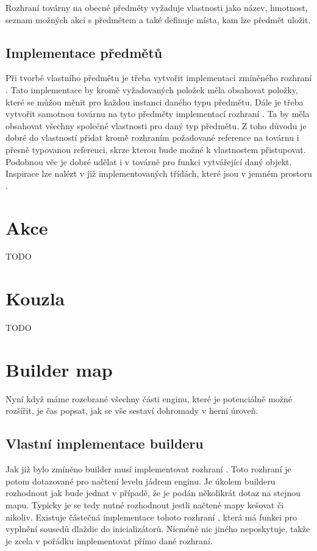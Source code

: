  Rozhraní továrny na obecné předměty vyžaduje vlastnosti jako název, hmotnost, seznam 
možných akcí s předmětem a také definuje místa, kam lze předmět uložit.

\subsection{Implementace předmětů}
Při tvorbě vlastního předmětu je třeba vytvořit implementaci zmíněného rozhraní . Tato implementace by 
kromě vyžadovaných položek měla obsahovat položky, které se můžou měnit pro každou instanci daného typu předmětu. 
Dále je třeba vytvořit samotnou továrnu na tyto předměty implementací rozhraní .
Ta by měla obsahovat všechny společné vlastnosti pro daný typ předmětu. Z toho  důvodu je dobré do vlastností 
přidat kromě rozhraním požadované reference na továrnu i přesně typovanou referenci, skrze kterou bude možné k 
vlastnostem přistupovat. Podobnou věc je dobré udělat i v továrně pro funkci vytvářející daný objekt. Inspirace
lze nalézt v již implementovaných třídách, které jsou v jemném prostoru .

\section{Akce}
TODO
\section{Kouzla}
TODO

\section{Builder map}
Nyní když máme rozebrané všechny části enginu, které je potenciálně možné rozšířit, je čas popsat, 
jak se vše sestaví dohromady v herní úroveň.

\subsection{Vlastní implementace builderu}
Jak již bylo zmíněno builder musí implementovat rozhraní . Toto rozhraní je
potom dotazované pro načtení levelu jádrem enginu. Je úkolem builderu rozhodnout jak bude jednat
v případě, že je podán několikrát dotaz na stejnou mapu. Typicky je se tedy nutné rozhodnout
jestli načtené mapy kešovat či nikoliv. Existuje částečná implementace tohoto rozhraní ,
která má funkci pro vyplnění sousedů dlaždic do inicializátorů. Nicméně nic jiného neposkytuje, takže
je zcela v pořádku implementovat přímo dané rozhraní.

